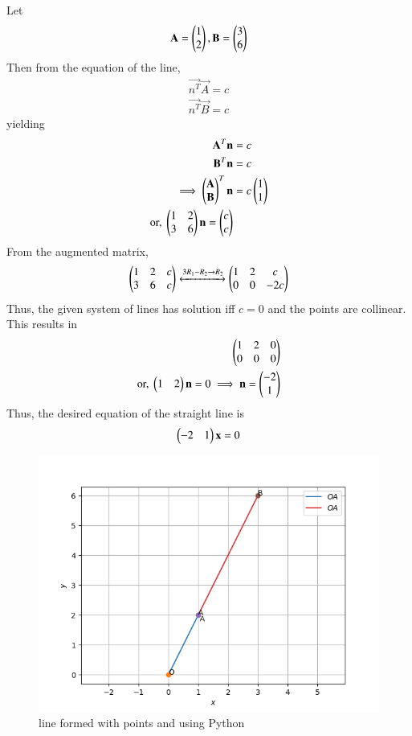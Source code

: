 Let 
\begin{align}
    \mathbf{A}=\begin{pmatrix}1\\2\end{pmatrix}, \mathbf{B}=\begin{pmatrix}3\\6\end{pmatrix}
\end{align}
Then from the equation of the line, 
\begin {align}
\vec{n^T} \vec {A}=c \label{july/1/76/eq:1} \\
\vec{n^T} \vec {B}=c  \label{july/1/76/eq:2} 
\end{align}
yielding
\begin{align}
    \mathbf{A}^T \mathbf {n}&=c \\
    \mathbf{B}^T \mathbf {n}&=c  \\
\implies     \begin{pmatrix}\mathbf{A} \\ \mathbf{B}\end{pmatrix}^T \mathbf{n}&=c\begin{pmatrix}1 \\ 1\end{pmatrix} \\
 \text{or, }  \begin{pmatrix}1 &2 \\ 3&6\end{pmatrix} \mathbf{n}=\begin{pmatrix}c\\c\end{pmatrix}
\end{align}
From the augmented matrix, 
\begin{align}
\begin{pmatrix} 1 &  2 & c \\ 3&  6& c \end{pmatrix} \xleftrightarrow{{3R_1-R_2\rightarrow R_2}} \begin{pmatrix} 1 &  2& c\\0 &  0 & -2c \end{pmatrix}
\end{align}
Thus,  the given system of lines has solution iff  $c = 0$  and the points are collinear.  This results in 
\begin{align}
    \begin{pmatrix} 1 &  2& 0\\0 &  0 & 0 \end{pmatrix} \\
\text{or, }    \begin{pmatrix}1&2\end{pmatrix}\mathbf{n}=0
\implies \mathbf{n}= \begin{pmatrix}-2\\1\end{pmatrix}
\end{align}
Thus, the desired equation of the straight line is 
\begin{align}
    \begin{pmatrix}-2&1\end{pmatrix} \mathbf{x}=0 
\end{align}
\begin{figure}[!ht]
\centering
\includegraphics[width=\columnwidth]{solutions/july/det/76/1/Figure_1.png}
\caption{line formed with points  and  using Python}
\label{july/1/76/fig:1}
\end{figure}